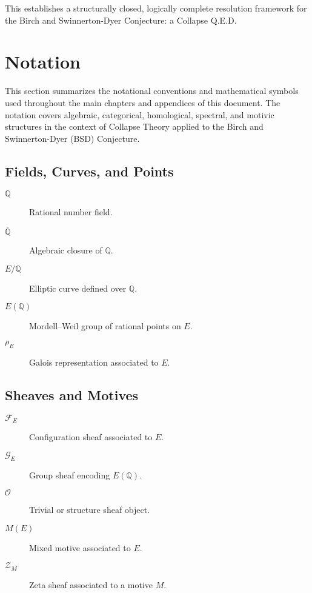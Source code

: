\documentclass[11pt]{article}
\begin{document}
This establishes a structurally closed, logically complete resolution framework for the Birch and Swinnerton-Dyer Conjecture: a Collapse Q.E.D.



\section*{Notation}

This section summarizes the notational conventions and mathematical symbols used throughout the main chapters and appendices of this document. The notation covers algebraic, categorical, homological, spectral, and motivic structures in the context of Collapse Theory applied to the Birch and Swinnerton-Dyer (BSD) Conjecture.

\subsection*{Fields, Curves, and Points}
\begin{description}
  \item[$\mathbb{Q}$] Rational number field.
  \item[$\overline{\mathbb{Q}}$] Algebraic closure of \( \mathbb{Q} \).
  \item[$E/\mathbb{Q}$] Elliptic curve defined over \( \mathbb{Q} \).
  \item[$E(\mathbb{Q})$] Mordell–Weil group of rational points on \( E \).
  \item[$\rho_E$] Galois representation associated to \( E \).
\end{description}

\subsection*{Sheaves and Motives}
\begin{description}
  \item[$\mathcal{F}_E$] Configuration sheaf associated to \( E \).
  \item[$\mathcal{G}_E$] Group sheaf encoding \( E(\mathbb{Q}) \).
  \item[$\mathcal{O}$] Trivial or structure sheaf object.
  \item[$M(E)$] Mixed motive associated to \( E \).
  \item[$\mathcal{Z}_M$] Zeta sheaf associated to a motive \( M \).
\end{description}
\end{document}
